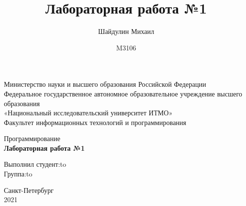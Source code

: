 \documentclass[a4paper,14pt]{article}
\author{Шайдулин Михаил}
\date{M3106}
\title{\textbf{Лабораторная работа №1}}
\begin{document}
\begin{titlepage}
\newpage

\begin{center}
Министерство науки и высшего образования Российской Федерации\\
Федеральное государственное автономное образовательное учреждение высшего образования\\
«Национальный исследовательский университет ИТМО»\\
Факультет информационных технологий и программирования\\
\end{center}

\vspace{\fill}

\begin{center}
Программирование\\
\textbf{Лабораторная работа №1}\\
\end{center}

\vspace{\fill}

\newbox{\lbox}
\newlength{\maxl}
\setlength{\maxl}{\wd\lbox}
\hfill\parbox{14cm}{
\hspace*{5cm}Выполнил студент:\hfill\hbox to\\
\hspace*{5cm}Группа:\hfill\hbox to\\
}


\vspace{8em}

\begin{center}
Санкт-Петербург \\2021
\end{center}

\end{titlepage}


\end{document}
